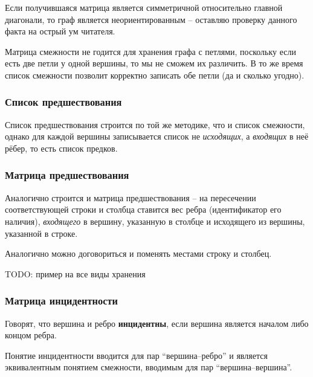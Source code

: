 \begin{remark}
	Если получившаяся матрица является симметричной относительно главной диагонали, то граф является неориентированным -- оставляю проверку данного факта на острый ум читателя.
\end{remark}

\begin{remark}
	Матрица смежности не годится для хранения графа с петлями, поскольку если есть две петли у одной вершины, то мы не сможем их различить. В то же время список смежности позволит корректно записать обе петли (да и сколько угодно).
\end{remark}

\subsubsection{Список предшествования}

Список предшествования строится по той же методике, что и список смежности, однако для каждой вершины записывается список не \textit{исходящих}, а \textit{входящих} в неё рёбер, то есть список предков.

\subsubsection{Матрица предшествования}

Аналогично строится и матрица предшествования -- на пересечении соответствующей строки и столбца ставится вес ребра (идентификатор его наличия), \textit{входящего} в вершину, указанную в столбце и исходящего из вершины, указанной в строке.

Аналогично можно договориться и поменять местами строку и столбец.

TODO: пример на все виды хранения

\subsubsection{Матрица инцидентности}

\begin{definition}
	Говорят, что вершина и ребро \textbf{инцидентны}, если вершина является началом либо концом ребра.
\end{definition}

\begin{remark}
	Понятие инцидентности вводится для пар ``вершина--ребро'' и является эквивалентным понятием смежности, вводимым для пар ``вершина--вершина''.
\end{remark}

